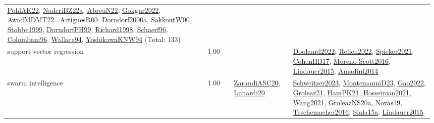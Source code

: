 {\begin{longtable}{p{3cm}r>{\raggedright\arraybackslash}p{6cm}>{\raggedright\arraybackslash}p{6cm}>{\raggedright\arraybackslash}p{8cm}}
\hyperref[detail:PohlAK22]{PohlAK22}, \hyperref[detail:NaderiBZ22a]{NaderiBZ22a}, \hyperref[detail:AbreuN22]{AbreuN22}, \hyperref[detail:Gokgur2022]{Gokgur2022}, \hyperref[detail:AwadMDMT22]{AwadMDMT22}...\hyperref[detail:ArtiguesR00]{ArtiguesR00}, \hyperref[detail:Dorndorf2000a]{Dorndorf2000a}, \hyperref[detail:SakkoutW00]{SakkoutW00}, \hyperref[detail:Stobbe1999]{Stobbe1999}, \hyperref[detail:DorndorfPH99]{DorndorfPH99}, \hyperref[detail:Richard1998]{Richard1998}, \hyperref[detail:Schaerf96]{Schaerf96}, \hyperref[detail:Colombani96]{Colombani96}, \hyperref[detail:Wallace94]{Wallace94}, \hyperref[detail:YoshikawaKNW94]{YoshikawaKNW94} (Total: 133)\\
\index{support vector regression}\index{Algorithms!support vector regression}support vector regression &  1.00 &  &  & \hyperref[detail:Doolaard2022]{Doolaard2022}, \hyperref[detail:Relich2022]{Relich2022}, \hyperref[detail:Spieker2021]{Spieker2021}, \hyperref[detail:CohenHB17]{CohenHB17}, \hyperref[detail:Moreno-Scott2016]{Moreno-Scott2016}, \hyperref[detail:Lindauer2015]{Lindauer2015}, \hyperref[detail:Amadini2014]{Amadini2014}\\
\index{swarm intelligence}\index{Algorithms!swarm intelligence}swarm intelligence &  1.00 &  & \hyperref[detail:ZarandiASC20]{ZarandiASC20}, \hyperref[detail:Lunardi20]{Lunardi20} & \hyperref[detail:Schweitzer2023]{Schweitzer2023}, \hyperref[detail:MontemanniD23]{MontemanniD23}, \hyperref[detail:Gao2022]{Gao2022}, \hyperref[detail:Groleaz21]{Groleaz21}, \hyperref[detail:HamPK21]{HamPK21}, \hyperref[detail:Hosseinian2021]{Hosseinian2021}, \hyperref[detail:Wang2021]{Wang2021}, \hyperref[detail:GroleazNS20a]{GroleazNS20a}, \hyperref[detail:Novas19]{Novas19}, \hyperref[detail:Teschemacher2016]{Teschemacher2016}, \hyperref[detail:Siala15a]{Siala15a}, \hyperref[detail:Lindauer2015]{Lindauer2015}\\

\end{longtable}}
